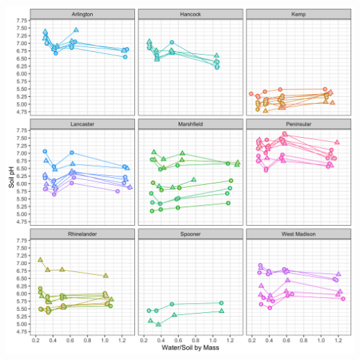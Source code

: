 \documentclass[]{article}
\begin{document}
\includegraphics{output-rmd/jackson-plot-ph-wisc-1.png}
\end{document}
